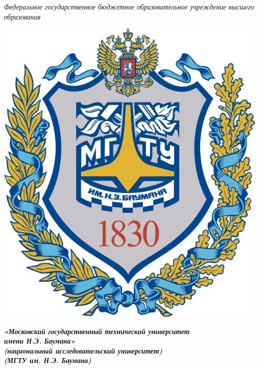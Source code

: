 \documentclass[12pt]{article}
\begin{document}
\begin{center}
    {
        \fontsize{10pt}{12pt}\selectfont
        \textit{Федеральное государственное бюджетное образовательное учреждение высшего образования}
        \par
    }
\end{center}

\begin{minipage}[t]{0.15\textwidth}
    
    \vspace{1pt}
    \includegraphics[width=0.1\paperwidth]{bmstu-logo}
\end{minipage}%
\begin{minipage}[t]{0.8\textwidth}
    \vspace{1pt}
    \begin{center}
        \fontsize{14pt}{16pt}\selectfont
        \textbf{
            \textit{
                «Московский государственный технический университет \\
                имени Н.Э. Баумана» \\
                (национальный исследовательский университет) \\
                (МГТУ им. Н.Э. Баумана)
            }
        }
    \end{center}
    \par
\end{minipage}%
\end{document}

